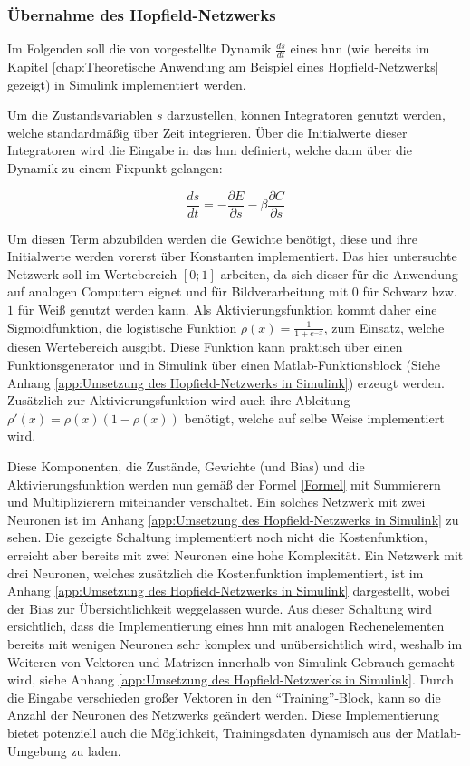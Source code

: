 \subsubsection{Übernahme des Hopfield-Netzwerks}
\label{chap:Übernahme des Hopfield-Netzwerks}

Im Folgenden soll die von \citeauthor{Scellier2017} vorgestellte Dynamik \(\frac{ds}{dt}\) eines \ac{hnn} (wie bereits im Kapitel \ref{chap:Theoretische Anwendung am Beispiel eines Hopfield-Netzwerks} gezeigt) in Simulink implementiert werden.

Um die Zustandsvariablen \(s\) darzustellen, können Integratoren genutzt werden, welche standardmäßig über Zeit integrieren. Über die Initialwerte dieser Integratoren wird die Eingabe in das \ac{hnn} definiert, welche dann über die Dynamik zu einem Fixpunkt gelangen:

\[\frac{ds}{dt}=-\frac{\partial{E}}{\partial{s}}-\beta\frac{\partial{C}}{\partial{s}}\]

Um diesen Term abzubilden werden die Gewichte benötigt, diese und ihre Initialwerte werden vorerst über Konstanten implementiert. Das hier untersuchte Netzwerk soll im Wertebereich \([0; 1]\) arbeiten, da sich dieser für die Anwendung auf analogen Computern eignet und für \zb Bildverarbeitung mit \(0\) für Schwarz bzw. \(1\) für Weiß genutzt werden kann. Als Aktivierungsfunktion kommt daher eine Sigmoidfunktion, die logistische Funktion \(\rho(x)=\frac{1}{1+e^{-x}}\), zum Einsatz, welche diesen Wertebereich ausgibt. Diese Funktion kann praktisch über einen Funktionsgenerator und in Simulink über einen Matlab-Funktionsblock (Siehe Anhang \ref{app:Umsetzung des Hopfield-Netzwerks in Simulink}) erzeugt werden. Zusätzlich zur Aktivierungsfunktion wird auch ihre Ableitung \(\rho'(x)=\rho(x)(1-\rho(x))\) benötigt, welche auf selbe Weise implementiert wird.

Diese Komponenten, die Zustände, Gewichte (und Bias) und die Aktivierungsfunktion werden nun gemäß der Formel \ref{Formel} mit Summierern und Multiplizierern miteinander verschaltet. Ein solches Netzwerk mit zwei Neuronen ist im Anhang \ref{app:Umsetzung des Hopfield-Netzwerks in Simulink} zu sehen. Die gezeigte Schaltung implementiert noch nicht die Kostenfunktion, erreicht aber bereits mit zwei Neuronen eine hohe Komplexität. Ein Netzwerk mit drei Neuronen, welches zusätzlich die Kostenfunktion implementiert, ist im Anhang \ref{app:Umsetzung des Hopfield-Netzwerks in Simulink} dargestellt, wobei der Bias zur Übersichtlichkeit weggelassen wurde. Aus dieser Schaltung wird ersichtlich, dass die Implementierung eines \ac{hnn} mit analogen Rechenelementen bereits mit wenigen Neuronen sehr komplex und unübersichtlich wird, weshalb im Weiteren von Vektoren und Matrizen innerhalb von Simulink Gebrauch gemacht wird, siehe Anhang \ref{app:Umsetzung des Hopfield-Netzwerks in Simulink}. Durch die Eingabe verschieden großer Vektoren in den "`Training"'-Block, kann so die Anzahl der Neuronen des Netzwerks geändert werden. Diese Implementierung bietet potenziell auch die Möglichkeit, Trainingsdaten dynamisch aus der Matlab-Umgebung zu laden.
